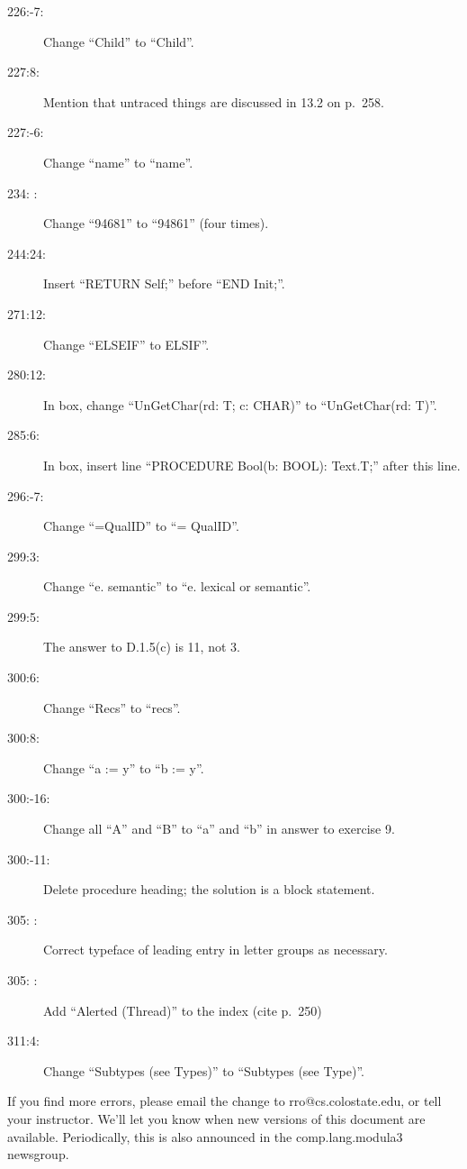 \begin{description}
\item[226:-7:] Change ``Child'' to ``{\sf Child}''.

\item[227:8:] Mention that untraced things are discussed in 13.2 on p.\ 258.

\item[227:-6:] Change ``name'' to ``{\sf name}''.

\item[234: :] Change ``94681'' to ``94861'' (four times).

\item[244:24:] Insert ``{\sf RETURN Self;}'' before ``{\sf END Init;}''.

\item[271:12:] Change ``{\sf ELSEIF}'' to {\sf ELSIF}''.

\item[280:12:] In box,
change ``{\sf UnGetChar(rd: T; c: CHAR)}'' to ``{\sf UnGetChar(rd: T)}''.

\item[285:6:] In box,
insert line ``{\sf PROCEDURE Bool(b: BOOL): Text.T;}'' after this line.

\item[296:-7:] Change ``{\sf =QualID}'' to ``{\sf = QualID}''.

\item[299:3:] Change ``e. semantic'' to ``e. lexical or semantic''.

\item[299:5:] The answer to D.1.5(c) is 11, not 3.

\item[300:6:] Change ``{\sf Recs}'' to ``{\sf recs}''.

\item[300:8:] Change ``{\sf a := y}'' to ``{\sf b := y}''.

\item[300:-16:] Change all ``{\sf A}'' and ``{\sf B}''
to ``{\sf a}'' and ``{\sf b}'' in answer to exercise 9.

\item[300:-11:] Delete procedure heading; the solution is a block statement.

\item[305: :] Correct typeface of leading entry in letter groups as necessary.

\item[305: :] Add ``Alerted (Thread)'' to the index (cite p.\ 250)

\item[311:4:] Change ``Subtypes (see Types)'' to ``Subtypes (see Type)''.
\end{description}

\noindent
If you find more errors, please email the change to 
rro@cs.colostate.edu, or tell your instructor.
We'll let you know when new versions of this document are available.
Periodically, this is also announced in the comp.lang.modula3
newsgroup.


